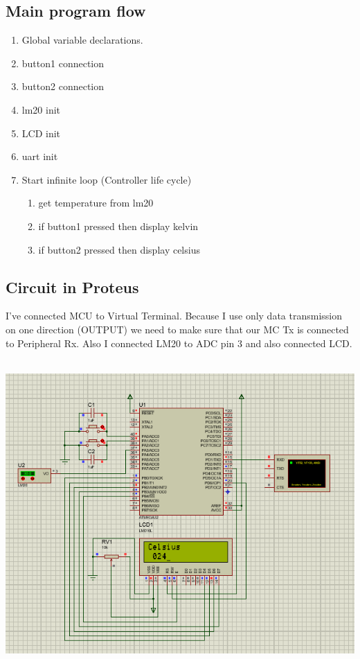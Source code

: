 \subsection{Main program flow}
\begin{enumerate}
	\item Global variable declarations.
	\item button1 connection
    \item button2 connection
    \item lm20 init
    \item LCD init
    \item uart init
	\item Start infinite loop (Controller life cycle)
    \begin{enumerate}
		\item get temperature from lm20
        \item if button1 pressed then display kelvin
        \item if button2 pressed then display celsius
	\end{enumerate}
\end{enumerate}


\newpage
\subsection{Circuit in Proteus}
I've connected MCU to Virtual Terminal. Because I use only data transmission on one direction (OUTPUT) we need to make sure that our MC Tx is connected to Peripheral Rx. Also I connected LM20 to ADC pin 3 and also connected LCD.\\\\
\centerline{
	\includegraphics[width=1.0\textwidth]{solution/images/schematics.png}
}

